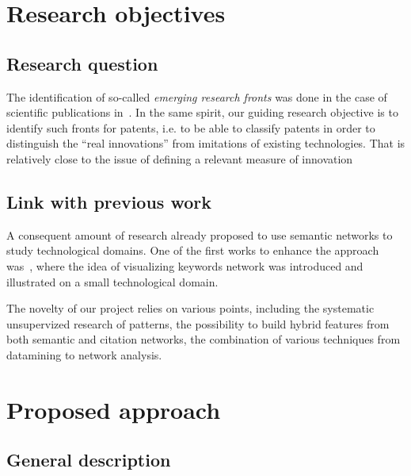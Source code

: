 \section{Research objectives}


\subsection{Research question}

The identification of so-called \emph{emerging research fronts} was done in the case of scientific publications in~\cite{shibata2008detecting}. In the same spirit, our guiding research objective is to identify such fronts for patents, i.e. to be able to classify patents in order to distinguish the ``real innovations'' from imitations of existing technologies. That is relatively close to the issue of defining a relevant measure of innovation~\cite{archibugi1988search}




\subsection{Link with previous work}


A consequent amount of research already proposed to use semantic networks to study technological domains. One of the first works to enhance the approach was~\cite{yoon2004text}, where the idea of visualizing keywords network was introduced and illustrated on a small technological domain.

The novelty of our project relies on various points, including the systematic unsupervized research of patterns, the possibility to build hybrid features from both semantic and citation networks, the combination of various techniques from datamining to network analysis.



\section{Proposed approach}

\subsection{General description}

